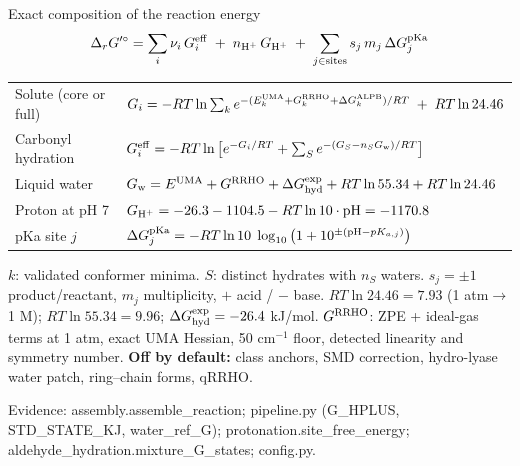 \documentclass[aspectratio=169,11pt]{beamer}
\newcommand{\src}[1]{\vfill{\tiny\color{muted}Evidence: #1\par}}
\newcommand{\dg}{\Delta_r G^{\prime\circ}}
\begin{document}
\begin{frame}{Exact composition of the reaction energy}
\vspace{-.2cm}
\[
 \dg=\sum_i \nu_i\,G_i^{\rm eff}\;+\;n_{\rm H^+}\,G_{\rm H^+}\;+\;\sum_{j\in\text{sites}} s_j\,m_j\,\Delta G_j^{\rm pKa}
\]
\vspace{-.15cm}\small
\renewcommand{\arraystretch}{1.55}
\begin{tabular}{@{}L{3.1cm}l@{}}
Solute (core or full) & $G_i=-RT\ln\sum_k e^{-(E^{\rm UMA}_k+G^{\rm RRHO}_k+\Delta G^{\rm ALPB}_k)/RT}\;+\;RT\ln 24.46$\\
Carbonyl hydration & $G_i^{\rm eff}=-RT\ln\big[e^{-G_i/RT}+\sum_S e^{-(G_S-n_S G_{\rm w})/RT}\big]$\\
Liquid water & $G_{\rm w}=E^{\rm UMA}+G^{\rm RRHO}+\Delta G^{\rm exp}_{\rm hyd}+RT\ln 55.34+RT\ln 24.46$\\
Proton at pH 7 & $G_{\rm H^+}=-26.3-1104.5-RT\ln10\cdot\mathrm{pH}=-1170.8$\\
pKa site $j$ & $\Delta G_j^{\rm pKa}=-RT\ln10\;\log_{10}\big(1+10^{\pm(\mathrm{pH}-pK_{a,j})}\big)$\\
\end{tabular}\par\vspace{.1cm}
\scriptsize
$k$: validated conformer minima. $S$: distinct hydrates with $n_S$ waters. $s_j=\pm1$ product/reactant, $m_j$ multiplicity, $+$ acid / $-$ base.
$RT\ln24.46=7.93$ (1 atm$\rightarrow$1 M); $RT\ln55.34=9.96$; $\Delta G^{\rm exp}_{\rm hyd}=-26.4$ kJ/mol.
$G^{\rm RRHO}$: ZPE + ideal-gas terms at 1 atm, exact UMA Hessian, 50 cm$^{-1}$ floor, detected linearity and symmetry number.
\textbf{Off by default:} class anchors, SMD correction, hydro-lyase water patch, ring--chain forms, qRRHO.
\src{assembly.assemble\_reaction; pipeline.py (G\_HPLUS, STD\_STATE\_KJ, water\_ref\_G); protonation.site\_free\_energy; aldehyde\_hydration.mixture\_G\_states; config.py.}
\end{frame}
\end{document}
